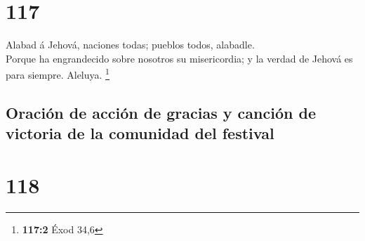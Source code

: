 \hypertarget{section-116}{%
\section{117}\label{section-116}}

 Alabad á Jehová, naciones todas; pueblos todos, alabadle.\\
 Porque ha engrandecido sobre nosotros su misericordia; y la
verdad de Jehová es para siempre. Aleluya. \footnote{\textbf{117:2} Éxod
  34,6}

\hypertarget{oraciuxf3n-de-acciuxf3n-de-gracias-y-canciuxf3n-de-victoria-de-la-comunidad-del-festival}{%
\subsection{Oración de acción de gracias y canción de victoria de la
comunidad del
festival}\label{oraciuxf3n-de-acciuxf3n-de-gracias-y-canciuxf3n-de-victoria-de-la-comunidad-del-festival}}

\hypertarget{section-117}{%
\section{118}\label{section-117}}

